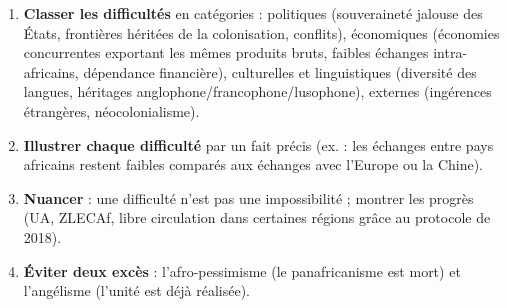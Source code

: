 \documentclass[11pt]{article}
\begin{document}
\begin{methode}
\begin{enumerate}
\item \textbf{Classer les difficultés} en catégories : politiques (souveraineté jalouse des États, frontières héritées de la colonisation, conflits), économiques (économies concurrentes exportant les mêmes produits bruts, faibles échanges intra-africains, dépendance financière), culturelles et linguistiques (diversité des langues, héritages anglophone/francophone/lusophone), externes (ingérences étrangères, néocolonialisme).
\item \textbf{Illustrer chaque difficulté} par un fait précis (ex. : les échanges entre pays africains restent faibles comparés aux échanges avec l'Europe ou la Chine).
\item \textbf{Nuancer} : une difficulté n'est pas une impossibilité ; montrer les progrès (UA, ZLECAf, libre circulation dans certaines régions grâce au protocole de 2018).
\item \textbf{Éviter deux excès} : l'afro-pessimisme (le panafricanisme est mort) et l'angélisme (l'unité est déjà réalisée).
\end{enumerate}
\end{methode}
\end{document}
